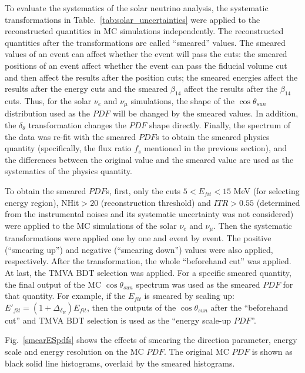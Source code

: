 To evaluate the systematics of the solar neutrino analysis, the systematic transformations in Table.~\ref{tab:solar_uncertainties} were applied to the reconstructed quantities in MC simulations independently. The reconstructed quantities after the transformations are called ``smeared'' values. The smeared values of an event can affect whether the event will pass the cuts: the smeared positions of an event affect whether the event can pass the fiducial volume cut and then affect the results after the position cuts; the smeared energies affect the results after the energy cuts and the smeared $\beta_{14}$ affect the results after the $\beta_{14}$ cuts. Thus, for the solar $\nu_e$ and $\nu_\mu$ simulations, the shape of the $\cos\theta_{sun}$ distribution used as the $PDF$ will be changed by the smeared values. In addition, the $\delta_\theta$ transformation changes the $PDF$ shape directly. Finally, the spectrum of the data was re-fit with the smeared $PDF$s to obtain the smeared physics quantity (specifically, the flux ratio $f_s$ mentioned in the previous section), and the differences between the original value and the smeared value are used as the systematics of the physics quantity.

To obtain the smeared $PDF$s, first, only the cuts $5<E_{fit}<15$ MeV (for selecting energy region), NHit$>20$ (reconstruction threshold) and $ITR>0.55$ (determined from the instrumental noises and its systematic uncertainty was not considered) were applied to the MC simulations of the solar $\nu_e$ and $\nu_\mu$. Then the systematic transformations were applied one by one and event by event. The positive (``smearing up'') and negative (``smearing down'') values were also applied, respectively. After the transformation, the whole ``beforehand cut'' was applied. At last, the TMVA BDT selection was applied. For a specific smeared quantity, the final output of the MC $\cos\theta_{sun}$ spectrum was used as the smeared $PDF$ for that quantity. For example, if the $E_{fit}$ is smeared by scaling up: $E'_{fit}=(1+\Delta_{\delta_E})E_{fit}$, then the outputs of the $\cos\theta_{sun}$ after the ``beforehand cut'' and TMVA BDT selection is used as the ``energy scale-up $PDF$''.

Fig.~\ref{smearESpdfs} shows the effects of smearing the direction parameter, energy scale and energy resolution on the MC $PDF$. The original MC $PDF$ is shown as black solid line histograms, overlaid by the smeared histograms.


